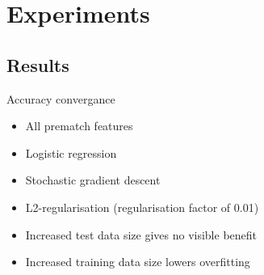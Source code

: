 \section{Experiments}
\subsection{Results}
\begin{frame}{Accuracy convergance}
\begin{minipage}{0.55\linewidth} 
\end{minipage}
\begin{minipage}{0.40\linewidth} 
\begin{itemize}
\item All prematch features
\item Logistic regression
\item Stochastic gradient descent 
\item L2-regularisation (regularisation factor of 0.01)
\end{itemize}
\vspace{0.05cm}
\begin{itemize}
\item Increased test data size gives no visible benefit
\item Increased training data size lowers overfitting
\end{itemize}
\end{minipage}
\end{frame}

